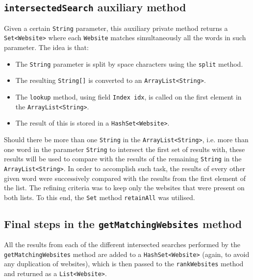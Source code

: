 \subsection{{\tt intersectedSearch} auxiliary method}
Given a certain {\tt String} parameter, this auxiliary private method returns a {\tt Set<Website>} where each {\tt Website} matches simultaneously all the words in such parameter. The idea is that:
\begin{itemize}
\item The {\tt String} parameter is split by space characters using the {\tt split} method.
\item The resulting {\tt String[]} is converted to an {\tt ArrayList<String>}.
\item The {\tt lookup} method, using field {\tt Index idx}, is called on the first element in the {\tt ArrayList<String>}.
\item The result of this is stored in a {\tt HashSet<Website>}.
\end{itemize}
Should there be more than one {\tt String} in the {\tt ArrayList<String>}, i.e. more than one word in the parameter {\tt String} to intersect the first set of results with, these results will be used to compare with the results of the remaining {\tt String} in the {\tt ArrayList<String>}. In order to accomplish such task, the results of every other given word were successively compared with the results from the first element of the list. The refining criteria was to keep only the websites that were present on both lists.
To this end, the {\tt Set} method {\tt retainAll} was utilised.

\subsection{Final steps in the {\tt getMatchingWebsites} method}
All the results from each of the different intersected searches performed by the {\tt getMatchingWebsites} method are added to a {\tt HashSet<Website>} (again, to avoid any duplication of websites), which is then passed to the {\tt rankWebsites} method and returned as a {\tt List<Website>}.

